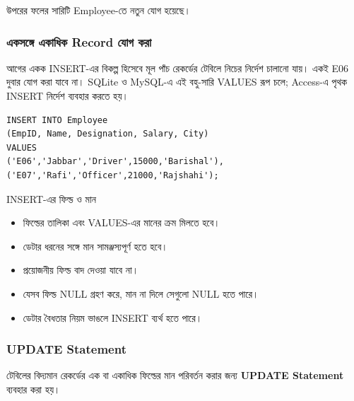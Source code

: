 উপরের ফলের সারিটি Employee-তে নতুন যোগ হয়েছে।

\subsubsection{একসঙ্গে একাধিক Record যোগ করা}

আগের একক INSERT-এর বিকল্প হিসেবে মূল পাঁচ রেকর্ডের টেবিলে নিচের নির্দেশ চালানো যায়। একই E06 দুবার যোগ করা যাবে না। SQLite ও MySQL-এ এই বহু-সারি VALUES রূপ চলে; Access-এ পৃথক INSERT নির্দেশ ব্যবহার করতে হয়।

\par\noindent\begin{minipage}{\linewidth}
\begin{verbatim}
INSERT INTO Employee
(EmpID, Name, Designation, Salary, City)
VALUES
('E06','Jabbar','Driver',15000,'Barishal'),
('E07','Rafi','Officer',21000,'Rajshahi');
\end{verbatim}
\end{minipage}\par

\begin{keypointbox}{INSERT-এর ফিল্ড ও মান}

\begin{itemize}

\item ফিল্ডের তালিকা এবং VALUES-এর মানের ক্রম মিলতে হবে।

\item ডেটার ধরনের সঙ্গে মান সামঞ্জস্যপূর্ণ হতে হবে।

\item প্রয়োজনীয় ফিল্ড বাদ দেওয়া যাবে না।

\item যেসব ফিল্ড NULL গ্রহণ করে, মান না দিলে সেগুলো NULL হতে পারে।

\item ডেটার বৈধতার নিয়ম ভাঙলে INSERT ব্যর্থ হতে পারে।

\end{itemize}

\end{keypointbox}

\subsubsection{UPDATE Statement}

\begin{definitionbox}{}

টেবিলের বিদ্যমান রেকর্ডের এক বা একাধিক ফিল্ডের মান পরিবর্তন
করার জন্য \textbf{UPDATE Statement} ব্যবহার করা হয়।

\end{definitionbox}

